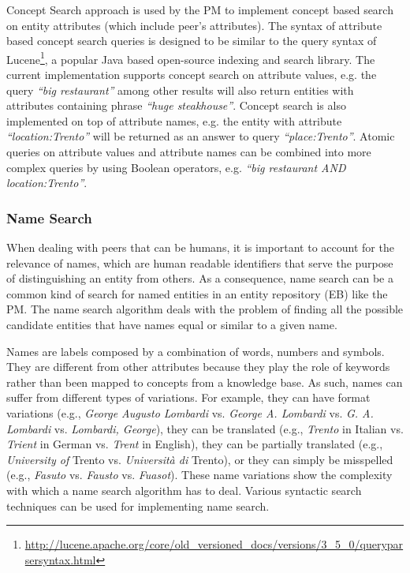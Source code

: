 Concept Search approach is used by the PM to implement concept based search on entity attributes (which include peer's attributes). The syntax of attribute based concept search queries is designed to be similar to the query syntax of Lucene\footnote{\url{http://lucene.apache.org/core/old_versioned_docs/versions/3_5_0/queryparsersyntax.html}}, a popular Java based open-source indexing and search library. The current implementation supports concept search on attribute values, e.g. the query \emph{``big restaurant''} among other results will also return entities with attributes containing phrase \emph{``huge steakhouse''}. Concept search is also implemented on top of attribute names, e.g. the entity with attribute \emph{``location:Trento''} will be returned as an answer to query \emph{``place:Trento''}. Atomic queries on attribute values and attribute names can be combined into more complex queries by using Boolean operators, e.g. \emph{``big restaurant AND location:Trento''}.

\subsubsection{Name Search}
\label{subsec:name_search}
When dealing with peers that can be humans, it is important to account for the relevance of names, which are human readable identifiers that serve the purpose of distinguishing an entity from others. As a consequence, name search can be a common kind of search for named entities in an entity repository (EB) like the PM. The name search algorithm deals with the problem of finding all the possible candidate entities that have names equal or similar to a given name.

Names are labels composed by a combination of words, numbers and symbols. They are different from other attributes because they play the role of keywords rather than been mapped to concepts from a knowledge base. As such, names can suffer from different types of variations. For example, they can have format variations (e.g., \emph{George Augusto Lombardi} vs. \emph{George A. Lombardi} vs. \emph{G. A. Lombardi} vs. \emph{Lombardi, George}), they can be translated (e.g., \emph{Trento} in Italian vs. \emph{Trient} in German vs. \emph{Trent} in English), they can be partially translated (e.g., \emph{University of} Trento vs.\emph{ Università di} Trento), or they can simply be misspelled (e.g., \emph{Fasuto} vs. \emph{Fausto} vs. \emph{Fuasot}). These name variations show the complexity with which a name search algorithm has to deal. Various syntactic search techniques can be used for implementing name search. 

